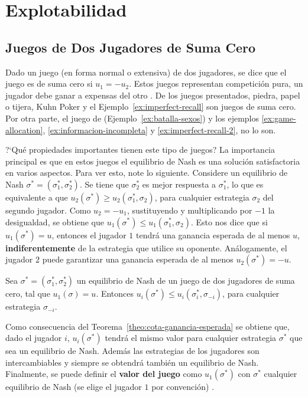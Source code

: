 \chapter{Explotabilidad}
\label{chapter:explotabilidad}

\section{Juegos de Dos Jugadores de Suma Cero}
\label{section:dos-jugadores-suma-cero}
Dado un juego (en forma normal o extensiva) de dos jugadores, se dice que el juego es de suma cero si $u_1 = -u_2$. Estos juegos representan competición pura, un jugador debe ganar a expensas del otro \cite[p.~5]{bib:handbook-blai}. De los juegos presentados, piedra, papel o tijera, Kuhn Poker y el Ejemplo~\ref{ex:imperfect-recall} son juegos de suma cero. Por otra parte, el juego de  (Ejemplo~\ref{ex:batalla-sexos}) y los  ejemplos \ref{ex:game-allocation}, \ref{ex:informacion-incompleta} y \ref{ex:imperfect-recall-2}, no lo son.

?`Qué propiedades importantes tienen este tipo de juegos? La importancia principal es que en estos juegos el equilibrio de Nash es una solución satisfactoria en varios aspectos. Para ver esto, note lo siguiente. Considere un equilibrio de Nash $\sigma^* = (\sigma^*_1, \sigma^*_2)$. Se tiene que $\sigma^*_2$ es mejor respuesta a $\sigma^*_1$, lo que es equivalente a que $u_2(\sigma^*) \geq u_2(\sigma^*_1, \sigma_2)$, para cualquier estrategia $\sigma_2$ del segundo jugador. Como $u_2 = -u_1$, sustituyendo y multiplicando por $-1$ la desigualdad, se obtiene que $u_1(\sigma^*) \leq u_1(\sigma^*_1, \sigma_2)$. Esto nos dice que si $u_1(\sigma^*) = u$, entonces el jugador $1$ tendrá una ganancia esperada de al menos $u$, \textbf{indiferentemente} de la estrategia que utilice su oponente. Análogamente, el jugador $2$ puede garantizar una ganancia esperada de al menos $u_2(\sigma^*) = -u$.

\begin{theorem}
\label{theo:cota-ganancia-esperada}
Sea $\sigma^* = (\sigma^*_1, \sigma^*_2)$ un equilibrio de Nash de un juego de dos jugadores de suma cero, tal que $u_1(\sigma) = u$. Entonces $u_i(\sigma^*) \leq u_i(\sigma^*_i, \sigma_{-i})$, para cualquier estrategia $\sigma_{-i}$.  
\end{theorem}

Como consecuencia del Teorema~\ref{theo:cota-ganancia-esperada} se obtiene que, dado el jugador $i$, $u_i(\sigma^*)$ tendrá el mismo valor para cualquier estrategia $\sigma^*$ que sea un equilibrio de Nash. Además las estrategias de los jugadores son intercambiables y siempre se obtendrá también un equilibrio de Nash. Finalmente, se puede definir el \textbf{valor del juego} como $u_1(\sigma^*)$ con $\sigma^*$ cualquier equilibrio de Nash (se elige el jugador $1$ por convención) \cite[p.~17]{bib:handbook-blai}.

